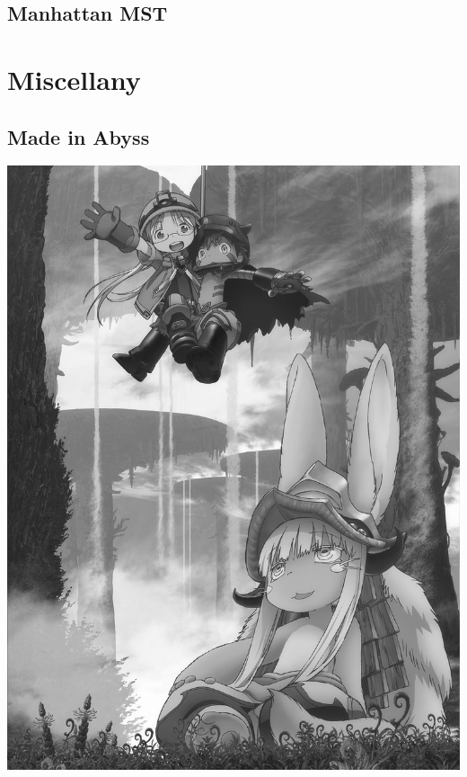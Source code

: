 \documentclass[a4paper,10pt,twocolumn,oneside]{article}
\begin{document}
\subsection{Manhattan MST}


\clearpage
\section{Miscellany}
\subsection{Made in Abyss}
\includegraphics[width=7in]{../images/miabyss}
\end{document}
